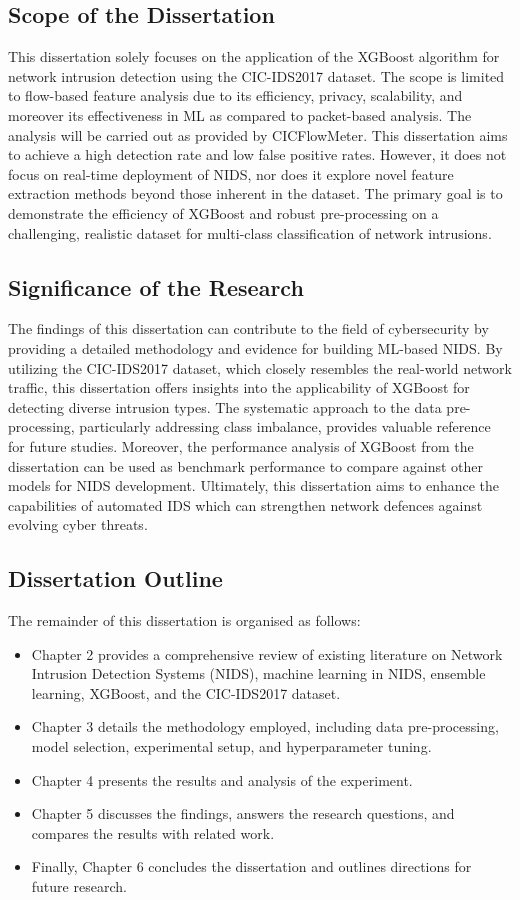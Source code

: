 \subsection{Scope of the Dissertation}
This dissertation solely focuses on the application of the XGBoost algorithm for network intrusion detection using the CIC-IDS2017 dataset. The scope is limited to flow-based feature analysis due to its efficiency, privacy, scalability, and moreover its effectiveness in ML as compared to packet-based analysis. The analysis will be carried out as provided by CICFlowMeter. This dissertation aims to achieve a high detection rate and low false positive rates. However, it does not focus on real-time deployment of NIDS, nor does it explore  novel feature extraction methods beyond those inherent in the dataset. The primary goal is to demonstrate the efficiency of XGBoost and robust pre-processing on a challenging, realistic dataset for multi-class classification of network intrusions.

\subsection{Significance of the Research}
The findings of this dissertation can contribute to the field of cybersecurity by providing a detailed methodology and evidence for building ML-based NIDS. By utilizing  the CIC-IDS2017 dataset, which closely resembles the real-world network traffic, this dissertation offers insights into the applicability of XGBoost for detecting diverse intrusion types. The systematic approach to the data pre-processing, particularly addressing class imbalance, provides valuable reference for future studies. Moreover, the performance analysis of XGBoost from the dissertation can be used as benchmark performance to compare against other models for NIDS development. Ultimately, this dissertation aims to enhance the capabilities of automated IDS which can strengthen network defences against evolving cyber threats.

\subsection{Dissertation Outline}
The remainder of this dissertation is organised as follows:
\begin{itemize}
	\item Chapter 2 provides a comprehensive review of existing literature on Network Intrusion Detection Systems (NIDS), machine learning in NIDS, ensemble learning, XGBoost, and the CIC-IDS2017 dataset.
	\item Chapter 3 details the methodology employed, including data pre-processing, model selection, experimental setup, and hyperparameter tuning.
	\item Chapter 4 presents the results and analysis of the experiment.
	\item Chapter 5 discusses the findings, answers the research questions, and compares the results with related work.
	\item Finally, Chapter 6 concludes the dissertation and outlines directions for future research.
\end{itemize}


